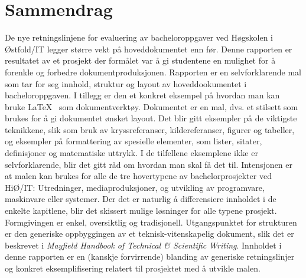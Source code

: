 \cleardoublepage

 \setcounter{page}{1}
\chapter*{Sammendrag}


De nye retningslinjene for evaluering av bacheloroppgaver ved Høgskolen i Østfold/IT legger større vekt på hoveddokumentet enn før. Denne rapporten er resultatet av et prosjekt der formålet var å gi studentene en mulighet for å forenkle og forbedre dokumentproduksjonen. Rapporten er en selvforklarende mal som tar for seg innhold, struktur og layout av hoveddookumentet i bacheloroppgaven. I tillegg er den et konkret eksempel på hvordan man kan bruke \LaTeX~ som dokumentverktøy. Dokumentet er en mal, dvs. et stilsett som brukes for å gi dokumentet ønsket layout.  Det blir gitt eksempler på de viktigste teknikkene, slik som bruk av kryssreferanser, kildereferanser, figurer og tabeller, og eksempler på formattering av spesielle elementer, som lister, sitater, definisjoner og matematiske uttrykk. I de tilfellene eksemplene ikke er selvforklarende, blir det gitt råd om hvordan man skal få det til. Intensjonen er at malen kan brukes for alle de tre hovertypene av bachelorprosjekter ved HiØ/IT: Utredninger, mediaproduksjoner, og utvikling av programvare, maskinvare eller systemer. Der det er naturlig å differensiere innholdet i de enkelte kapitlene, blir det skissert mulige løsninger for alle typene prosjekt. Formgivingen er enkel, oversiktlig og tradisjonell. Utgangspunktet for strukturen er den generiske oppbyggingen av et teknisk-vitenskapelig dokument, slik det er beskrevet i {\em Mayfield Handbook of Technical \& Scientific Writing}.
Innholdet i denne rapporten er en (kanskje forvirrende) blanding av generiske retningslinjer og konkret eksemplifisering relatert til prosjektet med å utvikle malen.